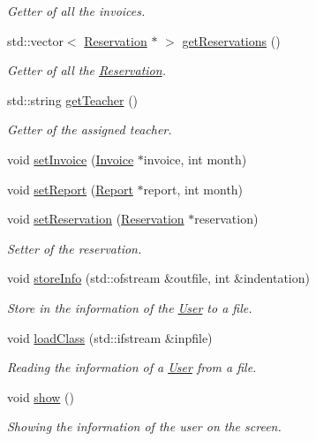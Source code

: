 \begin{DoxyCompactItemize}
\begin{DoxyCompactList}\small\item\em Getter of all the invoices. \end{DoxyCompactList}\item 
std\+::vector$<$ \mbox{\hyperlink{class_reservation}{Reservation}} $\ast$ $>$ \mbox{\hyperlink{class_user_a7443c5c7b1cca31c8400130568050327}{get\+Reservations}} ()
\begin{DoxyCompactList}\small\item\em Getter of all the \mbox{\hyperlink{class_reservation}{Reservation}}. \end{DoxyCompactList}\item 
std\+::string \mbox{\hyperlink{class_user_ac9fcbd4f944689de5faf746aa277d81a}{get\+Teacher}} ()
\begin{DoxyCompactList}\small\item\em Getter of the assigned teacher. \end{DoxyCompactList}\item 
void \mbox{\hyperlink{class_user_ad0432b83c7379ca57ed782d2929f3b8a}{set\+Invoice}} (\mbox{\hyperlink{class_invoice}{Invoice}} $\ast$invoice, int month)
\item 
void \mbox{\hyperlink{class_user_a0cdc359989bc67c3a135737cf1232a49}{set\+Report}} (\mbox{\hyperlink{class_report}{Report}} $\ast$report, int month)
\item 
void \mbox{\hyperlink{class_user_ab0e9dba3828977748ad6316eb346a854}{set\+Reservation}} (\mbox{\hyperlink{class_reservation}{Reservation}} $\ast$reservation)
\begin{DoxyCompactList}\small\item\em Setter of the reservation. \end{DoxyCompactList}\item 
void \mbox{\hyperlink{class_user_aac5ff0f6899f3ce56d1b2d12ed557c79}{store\+Info}} (std\+::ofstream \&outfile, int \&indentation)
\begin{DoxyCompactList}\small\item\em Store in the information of the \mbox{\hyperlink{class_user}{User}} to a file. \end{DoxyCompactList}\item 
void \mbox{\hyperlink{class_user_abc12a9ca668bd860a3d6d2ae4791997d}{load\+Class}} (std\+::ifstream \&inpfile)
\begin{DoxyCompactList}\small\item\em Reading the information of a \mbox{\hyperlink{class_user}{User}} from a file. \end{DoxyCompactList}\item 
\mbox{\label{class_user_ac8a201055d02b313721e56c4c0f6af82}} 
void \mbox{\hyperlink{class_user_ac8a201055d02b313721e56c4c0f6af82}{show}} ()
\begin{DoxyCompactList}\small\item\em Showing the information of the user on the screen. \end{DoxyCompactList}\end{DoxyCompactItemize}


